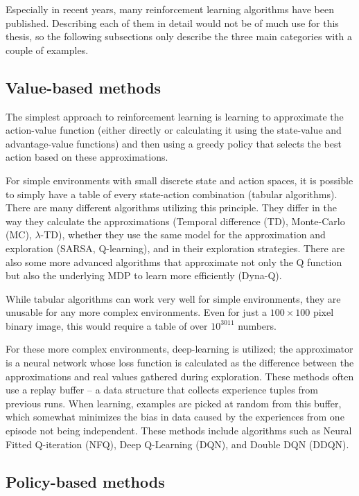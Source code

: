 \documentclass[
  digital,     %
  oneside,     %
  nosansbold,  %
  nocolorbold, %
  lof,         %
  lot,         %
]{fithesis4}
\begin{document}
Especially in recent years, many reinforcement learning algorithms have been published. Describing each of them in detail would not be of much use for this thesis, so the following subsections only describe the three main categories with a couple of examples.

\subsection{Value-based methods}

The simplest approach to reinforcement learning is learning to approximate the action-value function (either directly or calculating it using the state-value and advantage-value functions) and then using a greedy policy that selects the best action based on these approximations.

For simple environments with small discrete state and action spaces, it is possible to simply have a table of every state-action combination (tabular algorithms). There are many different algorithms utilizing this principle. They differ in the way they calculate the approximations (Temporal difference (TD), Monte-Carlo (MC), $\lambda$-TD), whether they use the same model for the approximation and exploration (SARSA, Q-learning), and in their exploration strategies. There are also some more advanced algorithms that approximate not only the Q function but also the underlying MDP to learn more efficiently (Dyna-Q).

While tabular algorithms can work very well for simple environments, they are unusable for any more complex environments. Even for just a $100 \times 100$ pixel binary image, this would require a table of over $10^{3011}$ numbers.

For these more complex environments, deep-learning is utilized; the approximator is a neural network whose loss function is calculated as the difference between the approximations and real values gathered during exploration. These methods often use a replay buffer -- a data structure that collects experience tuples from previous runs. When learning, examples are picked at random from this buffer, which somewhat minimizes the bias in data caused by the experiences from one episode not being independent. These methods include algorithms such as Neural Fitted Q-iteration (NFQ), Deep Q-Learning (DQN), and Double DQN (DDQN).

\subsection{Policy-based methods}
\end{document}
